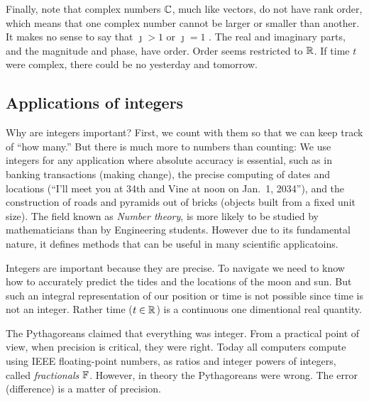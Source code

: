 \documentclass{ximera}
\begin{document}
Finally, note that complex numbers $\mathbb{C}$, much like vectors, do not have rank order, which means that
one complex number cannot be larger or smaller than another. 
It makes no sense to say that $\jmath > 1$ or $\jmath=1$ \citep{Boas87}.
The real and imaginary parts, and the magnitude and phase, have order.  Order seems restricted to $\mathbb{R}$.
If time $t$ were complex, there could be no yesterday and tomorrow.%

\subsection{Applications of integers}
Why are integers important?
First, we count with them so that we can keep track of ``how many.''
But there is much more to numbers than counting: We use integers for any application where absolute
accuracy is essential, such as in banking transactions (making change),
the precise computing of dates \citep[p.~70]{JS10} and locations (``I'll meet you at 34th and Vine
at noon on Jan.~1, 2034''), and the construction of roads and
pyramids out of bricks (objects built from a fixed unit size).
The field known as \emph{Number theory}, is more likely to be studied by mathematicians than by Engineering students.
However due to its fundamental nature, it defines methods that can be useful in many scientific applicatoins.

Integers are important because they are precise.
To navigate we need to know how to accurately predict the tides and the locations of the moon and sun. 
But such an integral representation of our position or time is not possible since time is not an integer.
Rather time ($t \in \mathbb{R}$) is a continuous one dimentional real quantity.

The Pythagoreans claimed that everything was integer. From a practical point of view, when precision is critical, they were right.
Today all computers compute using IEEE floating-point numbers, as ratios and integer powers of integers, called \emph{fractionals $\mathbb{F}$}.
However, in theory the Pythagoreans were wrong.
The error (difference) is a matter of precision.
\end{document}
